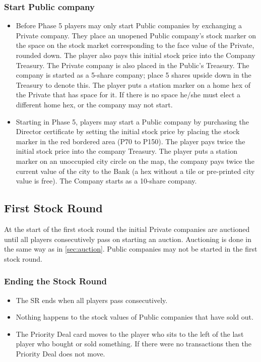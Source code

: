 \documentclass[a4paper,twocolumn]{article}
\begin{document}
\subsubsection{Start Public company}\label{sec:startpublic}
\begin{itemize}
	\item Before Phase 5 players may only start Public companies by exchanging a
	Private company. They place an unopened Public company's stock marker on the
	space on the stock market corresponding to the face value of the Private,
	rounded down. The player also pays this initial stock price into the Company
	Treasury. The Private company is also placed in the Public's Treasury. The
	company is started as a 5-share company; place 5 shares upside down in the
	Treasury to denote this. The player puts a station marker on a home hex of
	the Private that has space for it. If there is no space he/she must elect a
	different home hex, or the company may not start.
	\item Starting in Phase 5, players may start a Public company by purchasing
	the Director certificate by setting the initial stock price by placing the
	stock marker in the red bordered area (P70 to P150). The player pays twice
	the initial stock price into the company Treasury. The player puts a station
	marker on an unoccupied city circle on the map, the company pays twice the
	current value of the city to the Bank (a hex without a tile or pre-printed
	city value is free). The Company starts as a 10-share company.
\end{itemize}

\subsection{First Stock Round}
At the start of the first stock round the initial Private companies are
auctioned until all players consecutively pass on starting an auction.
Auctioning is done in the same way as in \autoref{sec:auction}. Public companies
may not be started in the first stock round.

\subsubsection{Ending the Stock Round}
\begin{itemize}
	\item The SR ends when all players pass consecutively.
	\item Nothing happens to the stock values of Public companies that have sold
	out.
	\item The Priority Deal card moves to the player who sits to the left of the
	last player who bought or sold something. If there were no transactions then
	the Priority Deal does not move.
\end{itemize}
\end{document}
